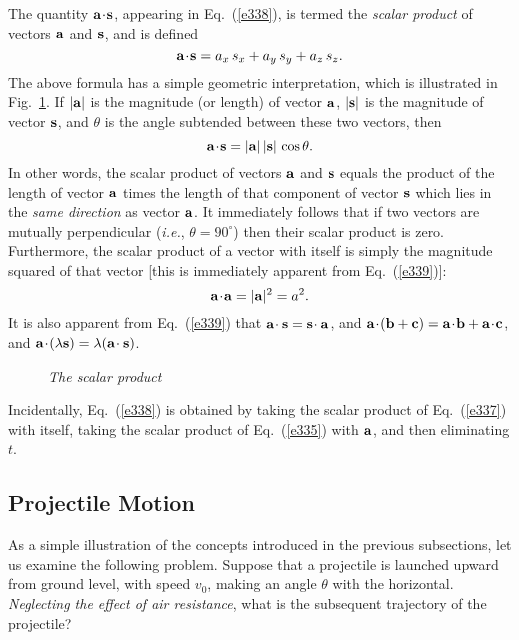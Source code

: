 The quantity ${\bf a}\!\cdot\!{\bf s}$, appearing in Eq.~(\ref{e338}), is termed
the {\em scalar product} of vectors ${\bf a}$ and ${\bf s}$, and is defined
\begin{equation}
{\bf a}\!\cdot\!{\bf s} = a_x\,s_x+ a_y\,s_y+a_z\,s_z.\label{e339}
\end{equation}
The above formula has a simple geometric interpretation, which is illustrated
in Fig.~\ref{f15}. If $|{\bf a}|$ is the magnitude (or length) of vector ${\bf a}$,
$|{\bf s}|$ is the magnitude of vector ${\bf s}$, and $\theta$ is the angle
subtended between these two vectors, then
\begin{equation}
{\bf a} \! \cdot \! {\bf s} = |{\bf a}| \,|{\bf s}|\, \cos\theta.
\end{equation}
In other words, the scalar product of vectors ${\bf a}$ and ${\bf s}$ equals
the product of the length of vector ${\bf a}$ times the length of that component of
vector ${\bf s}$ which lies in the {\em same direction} as vector ${\bf a}$. 
It immediately follows that if two vectors are mutually perpendicular
({\em i.e.}, $\theta =90^\circ$) then their scalar product is zero. Furthermore, the
scalar product of a vector with itself is simply the magnitude squared of that vector [this
is immediately apparent from Eq.~(\ref{e339})]:
\begin{equation}
{\bf a} \!\cdot \!{\bf a} = |{\bf a}|^2 = a^2.
\end{equation}
It is also apparent from Eq.~(\ref{e339}) that ${\bf a}\!\cdot{\bf s}= {\bf s}\!\cdot{\bf a}$,
and ${\bf a}\!\cdot\!({\bf b} +{\bf c}) = {\bf a}\!\cdot\!{\bf b}+{\bf a}\!\cdot\!{\bf c}$,
and ${\bf a}\!\cdot\!(\lambda {\bf s}) = \lambda({\bf a}\!\cdot{\bf s})$.

\begin{figure}
\epsfysize=2in
\centerline{}
\caption{\em The scalar product}\label{f15}   
\end{figure}

Incidentally, Eq.~(\ref{e338}) is obtained by taking the scalar product of Eq.~(\ref{e337}) with itself,
taking the scalar product of Eq.~(\ref{e335}) with ${\bf a}$, and then eliminating $t$.

\subsection{Projectile Motion}
As a simple illustration of the concepts introduced in the previous subsections,
let us examine
the following problem. Suppose that a projectile is launched upward
from ground level, with speed $v_0$, making an angle $\theta$
with the horizontal. {\em Neglecting the effect of air resistance}, what
is the subsequent trajectory of the projectile?

